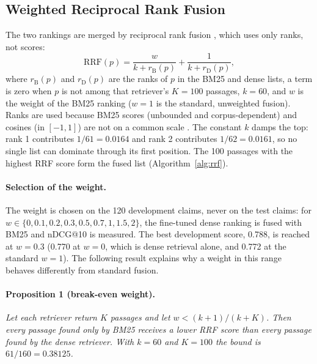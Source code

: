 \subsection{Weighted Reciprocal Rank Fusion}
\label{sec:rrf}

The two rankings are merged by reciprocal rank fusion \parencite{cormack2009rrf}, which uses
only ranks, not scores:
\begin{equation}
\mathrm{RRF}(p) = \frac{w}{k + r_{\mathrm{B}}(p)} + \frac{1}{k + r_{\mathrm{D}}(p)},
\label{eq:rrf}
\end{equation}
where $r_{\mathrm{B}}(p)$ and $r_{\mathrm{D}}(p)$ are the ranks of $p$ in the BM25 and dense
lists, a term is zero when $p$ is not among that retriever's $K = 100$ passages, $k = 60$, and
$w$ is the weight of the BM25 ranking ($w = 1$ is the standard, unweighted fusion). Ranks are
used because BM25 scores (unbounded and corpus-dependent) and cosines (in $[-1, 1]$) are not on a
common scale \parencite{bruch2024fusion}. The constant $k$ damps the top: rank 1 contributes
$1/61 = 0.0164$ and rank 2 contributes $1/62 = 0.0161$, so no single list can dominate through
its first position. The 100 passages with the highest RRF score form the fused list
(Algorithm~\ref{alg:rrf}).

\paragraph{Selection of the weight.} The weight is chosen on the 120 development claims, never
on the test claims: for $w \in \{0, 0.1, 0.2, 0.3, 0.5, 0.7, 1, 1.5, 2\}$, the fine-tuned dense
ranking is fused with BM25 and nDCG@10 is measured. The best development score, 0.788, is
reached at $w = 0.3$ (0.770 at $w = 0$, which is dense retrieval alone, and 0.772 at the
standard $w = 1$). The following result explains why a weight in this range behaves differently
from standard fusion.

\paragraph{Proposition 1 (break-even weight).}
\textit{Let each retriever return $K$ passages and let $w < (k+1)/(k+K)$. Then every passage
found only by BM25 receives a lower RRF score than every passage found by the dense retriever.
With $k = 60$ and $K = 100$ the bound is $61/160 = 0.38125$.}

